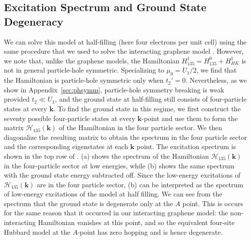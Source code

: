 \documentclass[prb,aps,amssymb,twocolumn,notitlepage]{revtex4-2}
\begin{document}
\subsection{Excitation Spectrum and Ground State Degeneracy}\label{subsec:ddslprops}
We can solve this model at half-filling (here four electrons per unit cell) using the same procedure that we used to solve the interacting graphene model . 
However, we note that, unlike the graphene models, the Hamiltonian $H^{1}_{135}=H_{135}^{0}+H_{HK}^{1}$ is not in general particle-hole symmetric. 
Specializing to $\mu_0=U_1/2$, we find that the Hamiltonian is particle-hole symmetric only when $t_2'=0$. 
Nevertheless, as we show in Appendix~\ref{sec:phsymm}, particle-hole symmetry breaking is weak provided $t_2\ll U_1$, and the ground state at half-filling still consists of four-particle states at every $\mathbf{k}$. 
To find the ground state in this regime, we first construct the seventy possible four-particle states at every $\mathbf{k}$-point and use them to form the matrix $\mathcal{H}_{135}(\mathbf{k})$ of the Hamiltonian in the four particle sector. 
We then diagonalize the resulting matrix to obtain the spectrum in the four particle sector and the corresponding eigenstates at each $\mathbf{k}$ point. 
The excitation spectrum is shown in the top row of . (a) shows the spectrum of the Hamiltonian $\mathcal{H}_{135}(\mathbf{k})$ in the four-particle sector at low energies, while (b) shows the same spectrum with the ground state energy subtracted off. 
Since the low-energy excitations of $\mathcal{H}_{135}(\mathbf{k})$ are in the four particle sector, (b) can be interpreted as the spectrum of low-energy excitations of the model at half filling.
We can see from the spectrum that the ground state is degenerate only at the $A$ point. 
This is occurs for the same reason that it occurred in our interacting graphene model: the non-interacting Hamiltonian vanishes at this point, and so the equivalent four-site Hubbard model at the $A$-point has zero hopping and is hence degenerate. 
\end{document}
